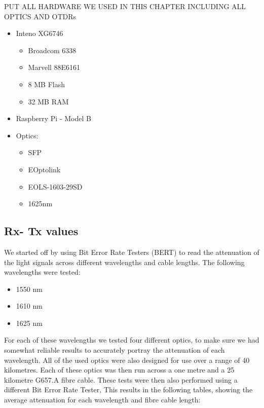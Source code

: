 \documentclass{article}
\begin{document}
PUT ALL HARDWARE WE USED IN THIS CHAPTER INCLUDING ALL OPTICS AND OTDRs
\begin{itemize}
\item Inteno XG6746 \cite{Inteno:XG6746}
\begin{itemize}
\item Broadcom 6338
\item Marvell 88E6161
\item 8 MB Flash
\item 32 MB RAM
\end{itemize}

\item Raspberry Pi - Model B

\item Optics:
\begin{itemize}
\item SFP
\item EOptolink
\item EOLS-1603-29SD
\item 1625nm
\end{itemize}
\end{itemize}


\subsection{Rx- Tx values}
We started off by using Bit Error Rate Testers (BERT) to read the attenuation of the light signals across different wavelengths and cable lengths.
The following wavelengths were tested:
\begin{itemize}
	\item 1550 nm
	\item 1610 nm
	\item 1625 nm
\end{itemize}

For each of these wavelengths we tested four different optics, to make sure we had somewhat reliable results to accurately portray the attenuation of each wavelength.
All of the used optics were also designed for use over a range of 40 kilometres.
Each of these optics was then run across a one metre and a 25 kilometre G657.A fibre cable.
These tests were then also performed using a different Bit Error Rate Tester, 
This results in the following tables, showing the average attenuation for each wavelength and fibre cable length:
\end{document}
